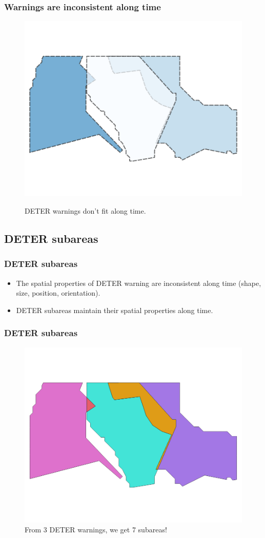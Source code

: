 \documentclass[aspectratio=169]{beamer}
\begin{document}
\begin{frame}
    \frametitle{Warnings are inconsistent along time}
    \begin{figure}[h] 
        \includegraphics[width=0.60\linewidth]
        {img/sample_deter_warnings.png}
        \label{fig:deter_subareas}
        \caption{DETER warnings don't fit along time.}
    \end{figure}
\end{frame}


\subsection{DETER subareas}


\begin{frame}
    \frametitle{DETER subareas}
    \begin{itemize}
        \item The spatial properties of DETER warning are inconsistent along 
            time (shape, size, position, orientation).
        \item DETER subareas maintain their spatial properties along time.
    \end{itemize}
\end{frame}

\begin{frame}
    \frametitle{DETER subareas}
    \begin{figure}[h] 
        \includegraphics[width=0.60\linewidth]
        {img/sample_deter_subareas.png}
        \caption{From 3 DETER warnings, we get 7 subareas!}
        \label{fig:deter_subareas}
    \end{figure}
\end{frame}
\end{document}
